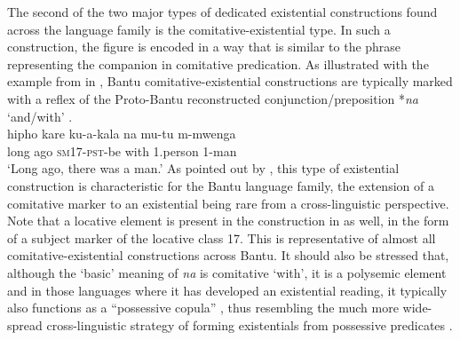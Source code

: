 \documentclass[output=paper]{langsci/langscibook}
\begin{document}
The second of the two major types of dedicated existential constructions found across the language family is the comitative-existential type. In such a construction, the figure is encoded in a way that is similar to the phrase representing the companion in comitative predication. As illustrated with the example from  in , Bantu comitative-existential constructions are typically marked with a reflex of the Proto-Bantu reconstructed conjunction/preposition *\textit{na} `and/with' \citep{BastinCoupez2002}.
\ea\label{ex:digo-man}
\\
\gll hipho kare ku-a-kala na mu-tu m-mwenga\\
  long ago \textsc{sm17-pst}-be with 1.person 1-man\\
\glt `Long ago, there was a man.'
\z
As pointed out by \citet{Creissels2014}, this type of existential
construction is characteristic for the Bantu language family, the extension
of a comitative marker to an existential being rare from a cross-linguistic
perspective. Note that a locative element is present in the construction in
 as well, in the form of a subject marker of the locative
class 17. This is representative of almost all comitative-existential constructions across Bantu. It should also be stressed that, although the `basic' meaning of \textit{na} is comitative `with', it is a polysemic element and in those languages where it has developed an existential reading, it typically also functions as a ``possessive copula'' \citep{Marten2013,GibsonGuerois2018}, thus resembling the much more wide-spread cross-linguistic strategy of forming existentials from possessive predicates \citep{Creissels2013}.
\end{document}
